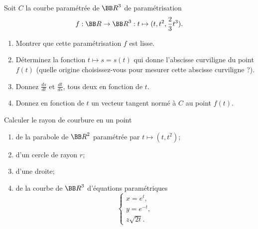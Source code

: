 \documentclass[12pt,french,oneside,a4paper]{memoir} %
\begin{document}
\begin{exo}
Soit $C$ la courbe paramétrée de ${\BB R}^3$ de paramétrisation
\begin{equation*}
f : {\BB R} \rightarrow {\BB R}^3 : t \mapsto (t,t^2, \frac{2}{3}t^3).
\end{equation*}
\begin{enumerate}
\item Montrer que cette paramétrisation $f$ est lisse.
\item Déterminez la fonction $t \mapsto s=s(t)$ qui donne l'abscisse
curviligne du point $f(t)$ (quelle origine choisissez-vous pour mesurer cette
abscisse curviligne ?). 
\item Donnez $\displaystyle{\frac{ds}{dt}}$ et
$\displaystyle{\frac{dt}{ds}}$, tous deux en fonction de $t$. 
\item Donnez en fonction de $t$ un vecteur tangent normé à $C$ au point
$f(t)$. 
\end{enumerate}
\end{exo}
\begin{exo}
Calculer le rayon de courbure en un point 
\begin{enumerate}
\item de la parabole de ${\BB R}^2$ paramétrée par $t \mapsto (t,t^2)$;
\item d'un cercle de rayon $r$;
\item d'une droite;
\item de la courbe de ${\BB R}^3$ d'équations paramétriques
$$
\left\{
\begin{array}{l}
x=e^t, \\
y=e^{-t}, \\
z \sqrt{2t}.
\end{array}
\right.
$$
\end{enumerate}
\end{exo}
\end{document}

